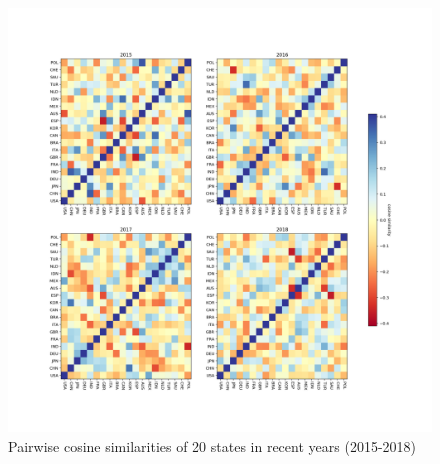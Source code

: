 \documentclass[final,authoryear,3p,12pt,times,hidelinks]{elsarticle}
\begin{document}
\begin{figure}[ht!]
  \begin{center}
    \includegraphics[trim=75 75 75 75, width=\textwidth]{graphs/doc2vec_consine_similarity_recent_years.png}
    \caption{Pairwise cosine similarities of 20 states in recent years (2015-2018)}
    \label{fig:doc2vec consine recent years}
  \end{center}
\end{figure}
\end{document}
